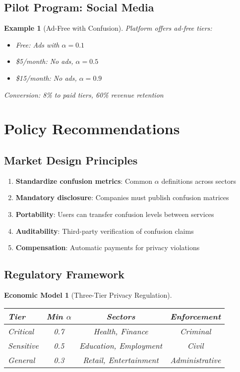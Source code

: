 \documentclass[11pt,final]{article}
\newtheorem{example}[theorem]{Example}
\newtheorem{model}[theorem]{Economic Model}
\begin{document}
\subsection{Pilot Program: Social Media}

\begin{example}[Ad-Free with Confusion]
Platform offers ad-free tiers:
\begin{itemize}
    \item Free: Ads with $\alpha = 0.1$
    \item \$5/month: No ads, $\alpha = 0.5$
    \item \$15/month: No ads, $\alpha = 0.9$
\end{itemize}
Conversion: 8\% to paid tiers, 60\% revenue retention
\end{example}

\section{Policy Recommendations}

\subsection{Market Design Principles}

\begin{enumerate}
    \item \textbf{Standardize confusion metrics}: Common $\alpha$ definitions across sectors
    \item \textbf{Mandatory disclosure}: Companies must publish confusion matrices
    \item \textbf{Portability}: Users can transfer confusion levels between services
    \item \textbf{Auditability}: Third-party verification of confusion claims
    \item \textbf{Compensation}: Automatic payments for privacy violations
\end{enumerate}

\subsection{Regulatory Framework}

\begin{model}[Three-Tier Privacy Regulation]
\begin{center}
\begin{tabular}{lccc}
\toprule
\textbf{Tier} & \textbf{Min $\alpha$} & \textbf{Sectors} & \textbf{Enforcement} \\
\midrule
Critical & 0.7 & Health, Finance & Criminal \\
Sensitive & 0.5 & Education, Employment & Civil \\
General & 0.3 & Retail, Entertainment & Administrative \\
\bottomrule
\end{tabular}
\end{center}
\end{model}
\end{document}
